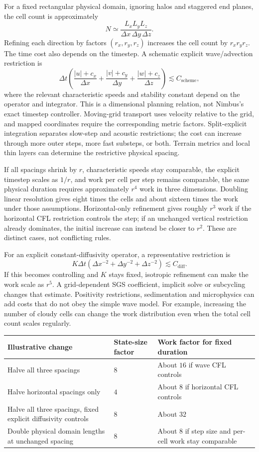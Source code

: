 For a fixed rectangular physical domain, ignoring halos and staggered end
planes, the cell count is approximately
\[
 N\simeq\frac{L_xL_yL_z}{\Delta x\,\Delta y\,\Delta z}.
\]
Refining each direction by factors $(r_x,r_y,r_z)$ increases the cell count by
$r_xr_yr_z$. The time cost also depends on the timestep. A schematic explicit
wave/advection restriction is
\[
 \Delta t\left(
 \frac{|u|+c_x}{\Delta x}
 +\frac{|v|+c_y}{\Delta y}
 +\frac{|w|+c_z}{\Delta z}\right)\lesssim C_{\mathrm{scheme}},
\]
where the relevant characteristic speeds and stability constant depend on the
operator and integrator. This is a dimensional planning relation, not Nimbus's
exact timestep controller. Moving-grid transport uses velocity relative to
the grid, and mapped coordinates require the corresponding metric factors.
Split-explicit integration separates slow-step and
acoustic restrictions; the cost can increase through more outer steps, more
fast substeps, or both. Terrain metrics and local thin layers can determine the
restrictive physical spacing.

If all spacings shrink by $r$, characteristic speeds stay comparable, the
explicit timestep scales as $1/r$, and work per cell per step remains comparable,
the same physical duration requires approximately $r^4$ work in three
dimensions. Doubling linear resolution gives eight times the cells and about
sixteen times the work under those assumptions. Horizontal-only refinement
gives roughly $r^3$ work if the horizontal CFL restriction controls the step;
if an unchanged vertical restriction already dominates, the initial increase
can instead be closer to $r^2$. These are distinct cases, not conflicting rules.

For an explicit constant-diffusivity operator, a representative restriction is
\[
 K\Delta t\left(\Delta x^{-2}+\Delta y^{-2}+\Delta z^{-2}\right)
 \lesssim C_{\mathrm{diff}}.
\]
If this becomes controlling and $K$ stays fixed, isotropic refinement can make
the work scale as $r^5$. A grid-dependent SGS coefficient, implicit solve or
subcycling changes that estimate. Positivity restrictions, sedimentation and
microphysics can add costs that do not obey the simple wave model. For example,
increasing the number of cloudy cells can change the work distribution even
when the total cell count scales regularly.

\begin{longtable}{@{}>{\raggedright\arraybackslash}p{}>{\centering\arraybackslash}p{}>{\raggedright\arraybackslash}p{}@{}}
\toprule
Illustrative change & State-size factor & Work factor for fixed duration \\
\midrule
\endhead
Halve all three spacings & $8$ & About $16$ if wave CFL controls \\
Halve horizontal spacings only & $4$ & About $8$ if horizontal CFL controls \\
Halve all three spacings, fixed explicit diffusivity controls & $8$ & About $32$ \\
Double physical domain lengths at unchanged spacing & $8$ & About $8$ if step
size and per-cell work stay comparable \\
\bottomrule
\end{longtable}

